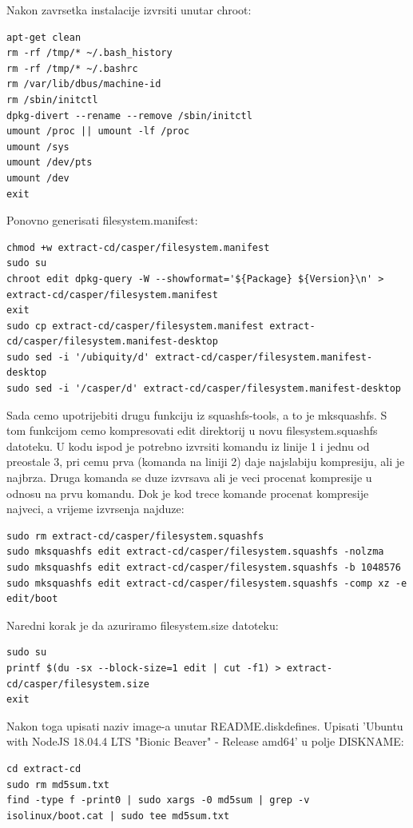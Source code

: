 \documentclass[12pt,vi]{mitthesis}
\begin{document}
\noindent
Nakon zavrsetka instalacije izvrsiti unutar chroot:
\begin{lstlisting}[style=BashInputStyle]
apt-get clean
rm -rf /tmp/* ~/.bash_history
rm -rf /tmp/* ~/.bashrc
rm /var/lib/dbus/machine-id
rm /sbin/initctl
dpkg-divert --rename --remove /sbin/initctl
umount /proc || umount -lf /proc
umount /sys
umount /dev/pts
umount /dev
exit
\end{lstlisting}

\noindent
Ponovno generisati filesystem.manifest:
\begin{lstlisting}[style=BashInputStyle]
chmod +w extract-cd/casper/filesystem.manifest
sudo su
chroot edit dpkg-query -W --showformat='${Package} ${Version}\n' > extract-cd/casper/filesystem.manifest
exit
sudo cp extract-cd/casper/filesystem.manifest extract-cd/casper/filesystem.manifest-desktop
sudo sed -i '/ubiquity/d' extract-cd/casper/filesystem.manifest-desktop
sudo sed -i '/casper/d' extract-cd/casper/filesystem.manifest-desktop
\end{lstlisting}

\noindent
Sada cemo upotrijebiti drugu funkciju iz squashfs-tools, a to je mksquashfs. S tom funkcijom cemo kompresovati edit direktorij u novu filesystem.squashfs datoteku. U kodu ispod je potrebno izvrsiti komandu iz linije 1 i jednu od preostale 3, pri cemu prva (komanda na liniji 2) daje najslabiju kompresiju, ali je najbrza. Druga komanda se duze izvrsava ali je veci procenat kompresije u odnosu na prvu komandu. Dok je kod trece komande procenat kompresije najveci, a vrijeme izvrsenja najduze:
\begin{lstlisting}[style=BashInputStyle]
sudo rm extract-cd/casper/filesystem.squashfs
sudo mksquashfs edit extract-cd/casper/filesystem.squashfs -nolzma 
sudo mksquashfs edit extract-cd/casper/filesystem.squashfs -b 1048576
sudo mksquashfs edit extract-cd/casper/filesystem.squashfs -comp xz -e edit/boot
\end{lstlisting}

\noindent
Naredni korak je da azuriramo filesystem.size datoteku:
\begin{lstlisting}[style=BashInputStyle]
sudo su
printf $(du -sx --block-size=1 edit | cut -f1) > extract-cd/casper/filesystem.size
exit
\end{lstlisting}

\noindent
Nakon toga upisati naziv image-a unutar README.diskdefines. 
Upisati 'Ubuntu with NodeJS 18.04.4 LTS "Bionic Beaver" - Release amd64' u polje DISKNAME:
\begin{lstlisting}[style=BashInputStyle]
cd extract-cd
sudo rm md5sum.txt
find -type f -print0 | sudo xargs -0 md5sum | grep -v isolinux/boot.cat | sudo tee md5sum.txt
\end{lstlisting}
\end{document}
